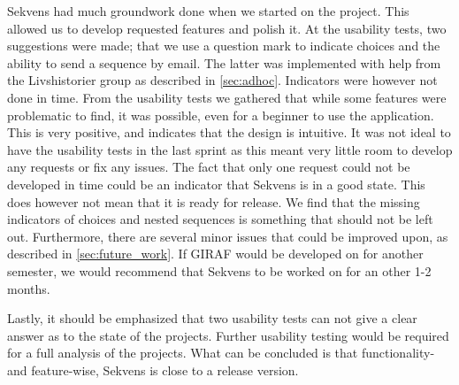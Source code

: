 Sekvens had much groundwork done when we started on the project. This allowed us to develop requested features and polish it. At the usability tests, two suggestions were made; that we use a question mark to indicate choices and the ability to send a sequence by email. The latter was implemented with help from the Livshistorier group as described in \ref{sec:adhoc}. Indicators were however not done in time.
From the usability tests we gathered that while some features were problematic to find, it was possible, even for a beginner to use the application. This is very positive, and indicates that the design is intuitive.
It was not ideal to have the usability tests in the last sprint as this meant very little room to develop any requests or fix any issues. The fact that only one request could not be developed in time could be an indicator that Sekvens is in a good state. This does however not mean that it is ready for release. We find that the missing indicators of choices and nested sequences is something that should not be left out. Furthermore, there are several minor issues that could be improved upon, as described in \ref{sec:future_work}. If GIRAF would be developed on for another semester, we would recommend that Sekvens to be worked on for an other 1-2 months.

Lastly, it should be emphasized that two usability tests can not give a clear answer as to the state of the projects. Further usability testing would be required for a full analysis of the projects. What can be concluded is that functionality- and feature-wise, Sekvens is close to a release version.